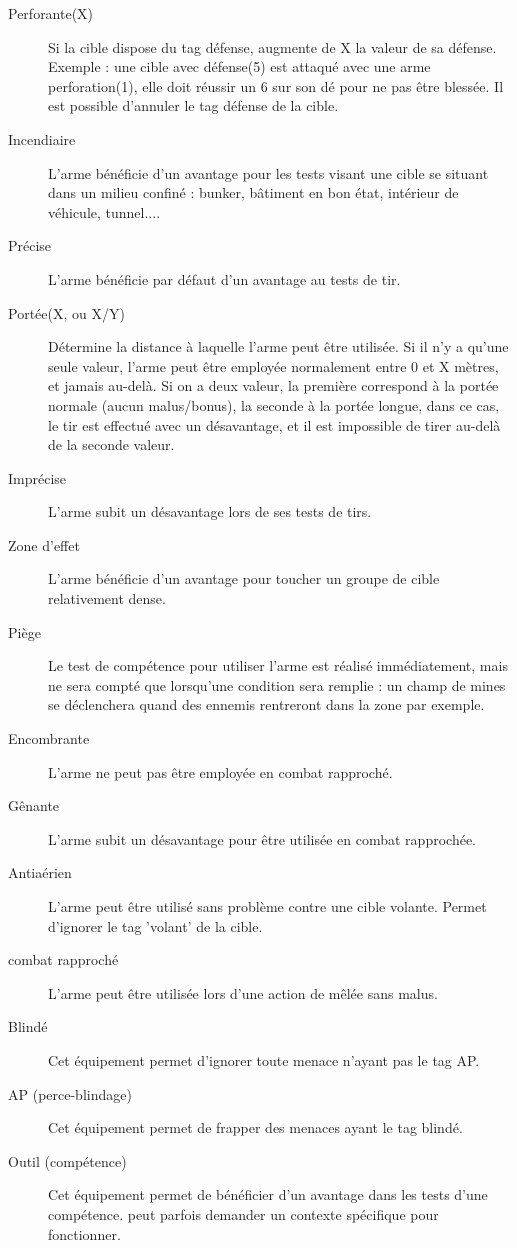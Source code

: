 \documentclass{report}
\begin{document}
\begin{multicols}{2}
\begin{description}
\item[Perforante(X)] Si la cible dispose du tag défense, augmente de X la valeur de sa défense. Exemple : une cible avec défense(5) est attaqué avec une arme perforation(1), elle doit réussir un 6 sur son dé pour ne pas être blessée. Il est possible d'annuler le tag défense de la cible.
\item[Incendiaire] L'arme bénéficie d'un avantage pour les tests visant une cible se situant dans un milieu confiné : bunker, bâtiment en bon état, intérieur de véhicule, tunnel....
\item[Précise]L'arme bénéficie par défaut d'un avantage au tests de tir.
\item[Portée(X, ou X/Y)] Détermine la distance à laquelle l'arme peut être utilisée. Si il n'y a qu'une seule valeur, l'arme peut être employée normalement entre 0 et X mètres, et jamais au-delà. Si on a deux valeur, la première correspond à la portée normale (aucun malus/bonus), la seconde à la portée longue, dans ce cas, le tir est effectué avec un désavantage, et il est impossible de tirer au-delà de la seconde valeur.
\item[Imprécise]L'arme subit un désavantage lors de ses tests de tirs.
\item[Zone d'effet]L'arme bénéficie d'un avantage pour toucher un groupe de cible relativement dense.
\item[Piège]Le test de compétence pour utiliser l'arme est réalisé immédiatement, mais ne sera compté que lorsqu'une condition sera remplie : un champ de mines se déclenchera quand des ennemis rentreront dans la zone par exemple.
\item[Encombrante] L'arme ne peut pas être employée en combat rapproché.
\item[Gênante]L'arme subit un désavantage pour être utilisée en combat rapprochée.
\item[Antiaérien] L'arme peut être utilisé sans problème contre une cible volante. Permet d'ignorer le tag 'volant' de la cible.
\item[combat rapproché] L'arme peut être utilisée lors d'une action de mêlée sans malus.
\item[Blindé] Cet équipement permet d'ignorer toute menace n'ayant pas le tag AP.
\item[AP (perce-blindage)] Cet équipement permet de frapper des menaces ayant le tag blindé.
\item[Outil (compétence)]Cet équipement permet de bénéficier d'un avantage dans les tests d'une compétence. peut parfois demander un contexte spécifique pour fonctionner.

\end{description}
\end{multicols}
\end{document}
